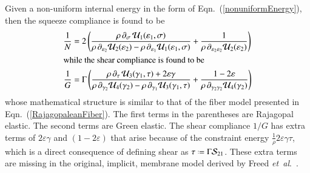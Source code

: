 Given a non-uniform internal energy in the form of Eqn.~(\ref{nonuniformEnergy}), then the squeeze compliance is found to be
\begin{subequations}
    \label{nonuniformCompliances}
    \begin{align}
    \frac{1}{N} & = 2 \left( \frac{\rho \, \partial_{\sigma\,} \hspace{0.5pt} \mathcal{U}_1 ( \varepsilon_1 , \sigma )}{\rho \, \partial_{\varepsilon_2}  \mathcal{U}_2 ( \varepsilon_2 ) - \rho \, \partial_{\varepsilon_1} \mathcal{U}_1 ( \varepsilon_1 , \sigma )} + \frac{1}{\rho \, \partial_{\varepsilon_2 \varepsilon_2} \mathcal{U}_2 ( \varepsilon_2 )} \right) 
    \label{squeezeCompliance} \\
    \intertext{while the shear compliance is found to be}
    \frac{1}{G} & = \Gamma \left( \frac{\rho \, \partial_{\tau\,} \hspace{0.5pt} \mathcal{U}_3 ( \gamma_1 , \tau ) + 2 \varepsilon \gamma}{\rho \, \partial_{\gamma_2} \mathcal{U}_4 ( \gamma_2 ) - \rho \, \partial_{\gamma_1}  \mathcal{U}_3 ( \gamma_1 , \tau )} + \frac{1 - 2\varepsilon}{\rho \, \partial_{\gamma_2 \gamma_2} \mathcal{U}_4 ( \gamma_2 )} \right)
    \label{shearCompliance}
    \end{align}
\end{subequations}
whose mathematical structure is similar to that of the fiber model presented in Eqn.~(\ref{RajagopaleanFiber}).  The first terms in the parentheses are Rajagopal elastic. The second terms are Green elastic.  The shear compliance $1/G$ has extra terms of $2 \varepsilon \gamma$ and $(1 - 2\varepsilon)$ that arise because of the constraint energy $\tfrac{1}{\rho} 2 \varepsilon \gamma \tau$, which is a direct consequence of defining shear as $\tau \defeq \Gamma \mathcal{S}_{21}$.  These extra terms are missing in the original, implicit, membrane model derived by Freed \textit{et~al}.~\cite{Freedetal17}.

